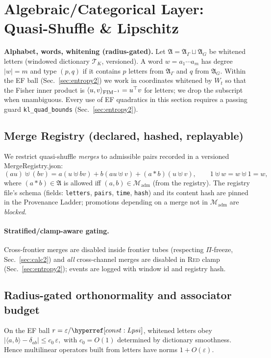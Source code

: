 \section{Algebraic/Categorical Layer: Quasi-Shuffle \& Lipschitz}\label{sec:adv-structures2}

\noindent\textbf{Alphabet, words, whitening (radius-gated).}
Let $\mathfrak A=\mathfrak A_\Gamma \sqcup \mathfrak A_G$ be whitened letters (windowed dictionary $\mathcal T_K$, versioned).
A word $w=a_1\cdots a_m$ has degree $|w|=m$ and type $(p,q)$ if it contains $p$ letters from $\mathfrak A_\Gamma$ and $q$ from $\mathfrak A_G$.
Within the EF ball (Sec.~\ref{sec:entropy2}) we work in coordinates whitened by $W_t$ so that the Fisher inner product is
$\langle u,v\rangle_{\mathrm{FIM}^{-1}}=u^\top v$ for letters; we drop the subscript when unambiguous.
Every use of EF quadratics in this section requires a passing guard \texttt{kl\_quad\_bounds} (Sec.~\ref{sec:entropy2}).

\subsection*{Merge Registry (declared, hashed, replayable)}
We restrict quasi-shuffle \emph{merges} to admissible pairs recorded in a versioned \textsf{MergeRegistry.json}:
\[
(a u)\uplus(b v)=a(u\uplus b v) + b(a u\uplus v) + (a\ast b)(u\uplus v),\qquad 1\uplus w=w\uplus 1=w,
\]
where $(a\ast b)\in\mathfrak A$ is allowed iff $(a,b)\in\mathcal M_{\mathrm{adm}}$ (from the registry).
The registry file’s schema (fields: \texttt{letters}, \texttt{pairs}, \texttt{time}, \texttt{hash}) and its content hash are pinned in the Provenance Ladder; promotions depending on a merge not in $\mathcal M_{\mathrm{adm}}$ are \emph{blocked}.

\paragraph{Stratified/clamp-aware gating.}
Cross-frontier merges are disabled inside frontier tubes (respecting $\Pi$-freeze, Sec.~\ref{sec:calc2}) and \emph{all} cross-channel merges are disabled in \textsc{Red} clamp (Sec.~\ref{sec:entropy2}); events are logged with window id and registry hash.

\subsection*{Radius-gated orthonormality and associator budget}
\begin{lemma}\label{lem:ortho}
\emph{}
On the EF ball $r=\varepsilon/\constref{Lpsi}$, whitened letters obey
\(
|\langle a,b\rangle - \delta_{ab}|\le c_0\,\varepsilon,
\)
with $c_0=O(1)$ determined by dictionary smoothness. Hence multilinear operators built from letters have norms $1+O(\varepsilon)$.
\end{lemma}

